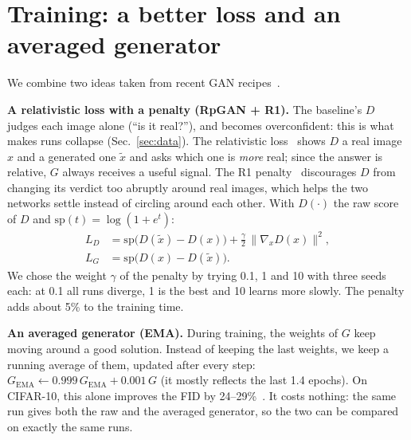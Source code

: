 \section{Training: a better loss and an averaged generator}\label{sec:training}

We combine two ideas taken from recent GAN recipes~\cite{huang2024}.

\textbf{A relativistic loss with a penalty (RpGAN + R1).} The baseline's $D$ judges each image alone (``is it real?''),
and becomes overconfident: this is what makes runs collapse (Sec.~\ref{sec:data}). The relativistic loss~\cite{jolicoeur2019}
shows $D$ a real image $x$ and a generated one $\tilde x$ and asks which one is \emph{more} real; since the answer is
relative, $G$ always receives a useful signal. The R1 penalty~\cite{mescheder2018} discourages $D$ from changing its
verdict too abruptly around real images, which helps the two networks settle instead of circling around each other.
With $D(\cdot)$ the raw score of $D$ and $\mathrm{sp}(t)=\log(1+e^t)$:
\begin{align*}
L_D &= \mathrm{sp}\big(D(\tilde x)-D(x)\big) + \tfrac{\gamma}{2}\,\|\nabla_x D(x)\|^2,\\
L_G &= \mathrm{sp}\big(D(x)-D(\tilde x)\big).
\end{align*}
We chose the weight $\gamma$ of the penalty by trying 0.1, 1 and 10 with three seeds each: at 0.1 all runs diverge, 1 is
the best and 10 learns more slowly. The penalty adds about 5\% to the training time.

\textbf{An averaged generator (EMA).} During training, the weights of $G$ keep moving around a good solution. Instead of
keeping the last weights, we keep a running average of them, updated after every step:
$G_\mathrm{EMA}\leftarrow 0.999\,G_\mathrm{EMA}+0.001\,G$ (it mostly reflects the last 1.4 epochs). On CIFAR-10, this
alone improves the FID by 24--29\%~\cite{yazici2019}. It costs nothing: the same run gives both the raw and the averaged
generator, so the two can be compared on exactly the same runs.

